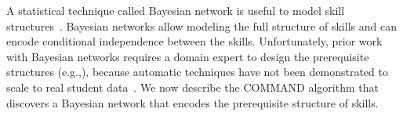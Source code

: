 \documentclass{edm_template}
\newcommand{\hl}[1]{\colorbox{yellow}{#1}}
\begin{document}

A statistical technique called Bayesian network is useful to model skill structures~\cite{mislevy2000bayes}. 
Bayesian networks allow  modeling the full structure of skills and can encode conditional independence  between the skills.
Unfortunately, prior work with Bayesian networks requires a domain expert to design the prerequisite structures (e.g.,\cite{kaser2014beyond}),
because automatic techniques have not been demonstrated to scale to real student data~\cite{scheines2014discovering}.
We now describe the COMMAND algorithm that discovers a Bayesian network that encodes the prerequisite structure of skills.

\end{document}
